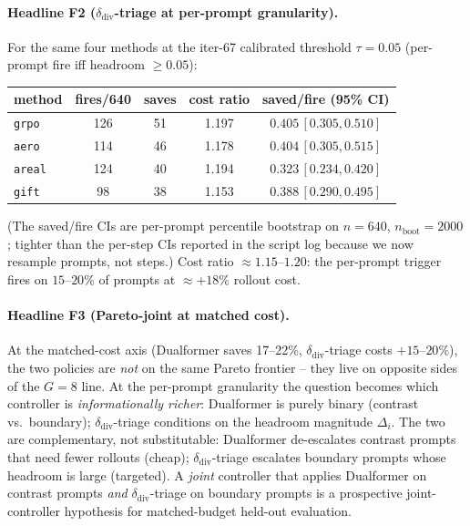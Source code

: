\paragraph{Headline F2 ($\delta_{\mathrm{div}}$-triage at per-prompt granularity).}
For the same four methods at the iter-67 calibrated threshold
$\tau{=}0.05$ (per-prompt fire iff headroom $\geq 0.05$):
\begin{center}
\begin{tabular}{lcccc}
\toprule
method & fires/640 & saves & cost ratio & saved/fire (95\% CI) \\
\midrule
\texttt{grpo}  & 126 & 51 & 1.197 & $0.405\,[0.305,0.510]$ \\
\texttt{aero}  & 114 & 46 & 1.178 & $0.404\,[0.305,0.515]$ \\
\texttt{areal} & 124 & 40 & 1.194 & $0.323\,[0.234,0.420]$ \\
\texttt{gift}  &  98 & 38 & 1.153 & $0.388\,[0.290,0.495]$ \\
\bottomrule
\end{tabular}
\end{center}
(The saved/fire CIs are per-prompt percentile bootstrap on $n{=}640$,
$n_{\mathrm{boot}}{=}2000$; tighter than the per-step CIs reported in
the script log because we now resample prompts, not steps.)  Cost
ratio $\approx 1.15$--$1.20$: the per-prompt trigger fires on $15$--$20\%$
of prompts at $\approx +18\%$ rollout cost.

\paragraph{Headline F3 (Pareto-joint at matched cost).}
At the matched-cost axis (Dualformer saves 17--22\%, $\delta_{\mathrm{div}}$-triage
costs $+15$--$20\%$), the two policies are \emph{not} on the same
Pareto frontier -- they live on opposite sides of the $G{=}8$ line.
At the per-prompt granularity the question becomes which controller is
\emph{informationally richer}: Dualformer is purely binary
(contrast vs.\ boundary); $\delta_{\mathrm{div}}$-triage conditions on
the headroom magnitude $\Delta_i$. The two are complementary, not
substitutable: Dualformer de-escalates contrast prompts that need
fewer rollouts (cheap); $\delta_{\mathrm{div}}$-triage escalates
boundary prompts whose headroom is large (targeted). A
\emph{joint} controller that applies Dualformer on contrast prompts
\emph{and} $\delta_{\mathrm{div}}$-triage on boundary prompts is a
prospective joint-controller hypothesis for matched-budget held-out evaluation.

